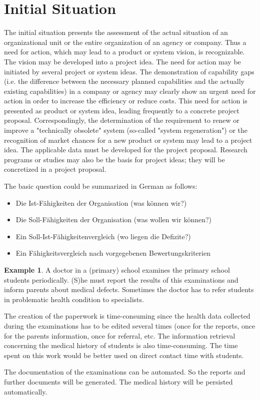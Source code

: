 \documentclass[12pt]{article}
\theoremstyle{definition}
\newtheorem{example}{Example}
\newenvironment{explanation}{%
   \setlength{\parindent}{0pt}
   \itshape
   \color{blue}
}{}
\begin{document}
\section{Initial Situation}
\begin{explanation}
The initial situation presents the assessment of the actual situation of an organizational unit or the entire organization of an agency or company. Thus a need for action, which may lead to a product or system vision, is recognizable. The vision may be developed into a project idea. The need for action may be initiated by several project or system ideas.
The demonstration of capability gaps (i.e. the difference between the necessary planned capabilities and the actually existing capabilities) in a company or agency may clearly show an urgent need for action in order to increase the efficiency or reduce costs. This need for action is presented as product or system idea, leading frequently to a concrete project proposal. Correspondingly, the determination of the requirement to renew or improve a "technically obsolete" system (so-called "system regeneration") or the recognition of market chances for a new product or system may lead to a project idea. The applicable data must be developed for the project proposal.
Research programs or studies may also be the basis for project ideas; they will be concretized in a project proposal.

The basic question could be summarized in German as follows:
\begin{itemize}
	\item Die Ist-Fähigkeiten der Organisation (was können wir?)
	\item Die Soll-Fähigkeiten der Organisation (was wollen wir können?)
	\item Ein Soll-Ist-Fähigkeitenvergleich (wo liegen die Defizite?)
	\item Ein Fähigkeitsvergleich nach vorgegebenen Bewertungskriterien
\end{itemize}
\end{explanation}

\begin{example}
A doctor in a (primary) school examines the primary school students periodically. (S)he must report the results of this examinations and inform parents about medical defects. Sometimes the doctor has to refer students in problematic health condition to specialists.

The creation of the paperwork is time-consuming since the health data collected during the examinations has to be edited several times (once for the reports, once for the parents information, once for referral, etc. The information retrieval concerning the medical history of students is also time-consuming. The time spent on this work would be better used on direct contact time with students.

The documentation of the examinations can be automated. So the reports and further documents will be generated. The medical history will be persisted automatically.
\end{example}
\end{document}

